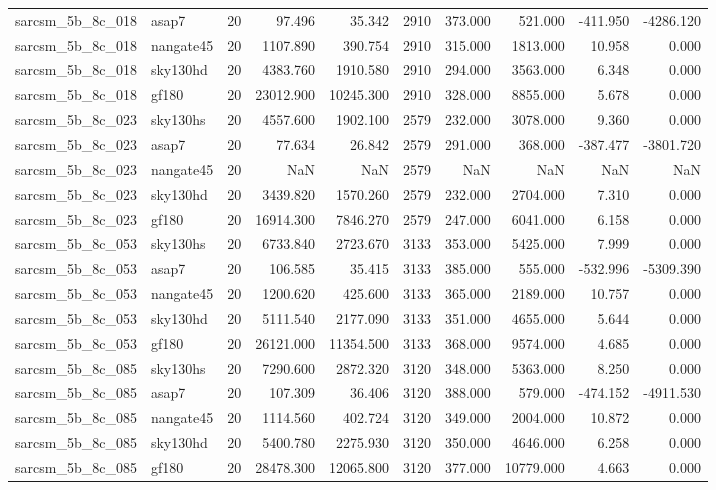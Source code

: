\documentclass{article}
\begin{document}
\begin{longtable}{llrrrrrrrr}
sarcsm\_5b\_8c\_018 & asap7 & 20 & 97.496 & 35.342 & 2910 & 373.000 & 521.000 & -411.950 & -4286.120 \\
sarcsm\_5b\_8c\_018 & nangate45 & 20 & 1107.890 & 390.754 & 2910 & 315.000 & 1813.000 & 10.958 & 0.000 \\
sarcsm\_5b\_8c\_018 & sky130hd & 20 & 4383.760 & 1910.580 & 2910 & 294.000 & 3563.000 & 6.348 & 0.000 \\
sarcsm\_5b\_8c\_018 & gf180 & 20 & 23012.900 & 10245.300 & 2910 & 328.000 & 8855.000 & 5.678 & 0.000 \\
sarcsm\_5b\_8c\_023 & sky130hs & 20 & 4557.600 & 1902.100 & 2579 & 232.000 & 3078.000 & 9.360 & 0.000 \\
sarcsm\_5b\_8c\_023 & asap7 & 20 & 77.634 & 26.842 & 2579 & 291.000 & 368.000 & -387.477 & -3801.720 \\
sarcsm\_5b\_8c\_023 & nangate45 & 20 & NaN & NaN & 2579 & NaN & NaN & NaN & NaN \\
sarcsm\_5b\_8c\_023 & sky130hd & 20 & 3439.820 & 1570.260 & 2579 & 232.000 & 2704.000 & 7.310 & 0.000 \\
sarcsm\_5b\_8c\_023 & gf180 & 20 & 16914.300 & 7846.270 & 2579 & 247.000 & 6041.000 & 6.158 & 0.000 \\
sarcsm\_5b\_8c\_053 & sky130hs & 20 & 6733.840 & 2723.670 & 3133 & 353.000 & 5425.000 & 7.999 & 0.000 \\
sarcsm\_5b\_8c\_053 & asap7 & 20 & 106.585 & 35.415 & 3133 & 385.000 & 555.000 & -532.996 & -5309.390 \\
sarcsm\_5b\_8c\_053 & nangate45 & 20 & 1200.620 & 425.600 & 3133 & 365.000 & 2189.000 & 10.757 & 0.000 \\
sarcsm\_5b\_8c\_053 & sky130hd & 20 & 5111.540 & 2177.090 & 3133 & 351.000 & 4655.000 & 5.644 & 0.000 \\
sarcsm\_5b\_8c\_053 & gf180 & 20 & 26121.000 & 11354.500 & 3133 & 368.000 & 9574.000 & 4.685 & 0.000 \\
sarcsm\_5b\_8c\_085 & sky130hs & 20 & 7290.600 & 2872.320 & 3120 & 348.000 & 5363.000 & 8.250 & 0.000 \\
sarcsm\_5b\_8c\_085 & asap7 & 20 & 107.309 & 36.406 & 3120 & 388.000 & 579.000 & -474.152 & -4911.530 \\
sarcsm\_5b\_8c\_085 & nangate45 & 20 & 1114.560 & 402.724 & 3120 & 349.000 & 2004.000 & 10.872 & 0.000 \\
sarcsm\_5b\_8c\_085 & sky130hd & 20 & 5400.780 & 2275.930 & 3120 & 350.000 & 4646.000 & 6.258 & 0.000 \\
sarcsm\_5b\_8c\_085 & gf180 & 20 & 28478.300 & 12065.800 & 3120 & 377.000 & 10779.000 & 4.663 & 0.000 \\

\end{longtable}
\end{document}
